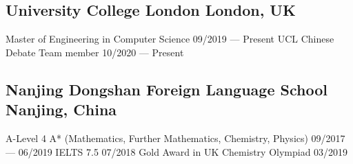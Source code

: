 
\subsection{University College London \hfill London, UK}
    Master of Engineering in Computer Science 
        \hfill 09/2019 --- Present 
    \newline
    UCL Chinese Debate Team member
        \hfill 10/2020 --- Present


\vspace{0.5em}


\subsection{Nanjing Dongshan Foreign Language School \hfill Nanjing, China}
    A-Level 4 A* (Mathematics, Further Mathematics, Chemistry, Physics) 
        \hfill 09/2017 --- 06/2019 
    \newline
    IELTS 7.5 
        \hfill 07/2018 
    \newline
    Gold Award in UK Chemistry Olympiad
        \hfill 03/2019


